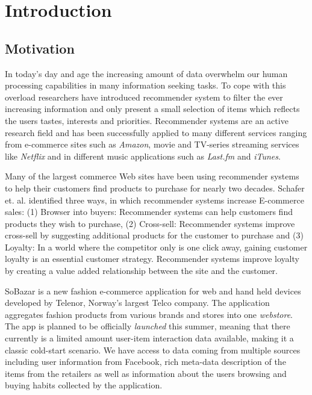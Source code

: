 
\chapter{Introduction}
\minitoc
\setcounter{page}{1}

\clearpage

\section{Motivation}


In today's day and age the increasing amount of data overwhelm our human processing capabilities in many information seeking tasks. To cope with this overload researchers have introduced recommender system to filter the ever increasing information and only present a small selection of items which reflects the users tastes, interests and priorities. Recommender systems are an active research field and has been successfully applied to many different services ranging from e-commerce sites such as \emph{Amazon}, movie and TV-series streaming services like \emph{Netflix} and in different music applications such as \emph{Last.fm} and \emph{iTunes}.

Many of the largest commerce Web sites have been using recommender systems to help their customers find products to purchase for nearly two decades.
Schafer et. al. \cite{Schafer1999} identified three ways, in which recommender systems increase E-commerce sales: (1) Browser into buyers: Recommender systems can help customers find products they wish to purchase, (2) Cross-sell: Recommender systems improve cross-sell by suggesting additional products for the customer to purchase and (3) Loyalty: In a world where the competitor only is one click away, gaining customer loyalty is an essential customer strategy. Recommender systems improve loyalty by creating a value added relationship between the site and the customer.

SoBazar is a new fashion e-commerce application for web and hand held devices developed by Telenor, Norway's largest Telco company. The application aggregates fashion products from various brands and stores into one \emph{webstore}. The app is planned to be officially \emph{launched} this summer, meaning that there currently is a limited amount user-item interaction data available, making it a classic cold-start scenario. We have access to data coming from multiple sources including user information from Facebook, rich meta-data description of the items from the retailers as well as information about the users browsing and buying habits collected by the application.

